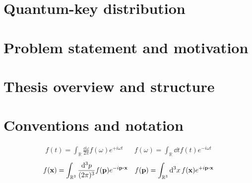\section{Quantum-key distribution}


\section{Problem statement and motivation}


\section{Thesis overview and structure}


\section{Conventions and notation}


\begin{align}
	f(t)
	=
	\int_{\mathbb{R}}\frac{\dd{\omega}}{2\pi}
	f(\omega)
	e^{+i\omega t}
	&&
	f(\omega)
	=
	\int_{\mathbb{R}}\dd{t}
	f(t)
	e^{-i\omega t}
\end{align}
\begin{align}
	f(\vb{x})
	=
	\int_{\mathbb{R}^3}\frac{\dd[3]{p}}{(2\pi)^3}
	f(\vb{p})
	e^{-i\vb{p}\vdot\vb{x}}
	&&
	f(\vb{p})
	=
	\int_{\mathbb{R}^3}\dd[3]{x}
	f(\vb{x})
	e^{+i\vb{p}\vdot\vb{x}}
\end{align}